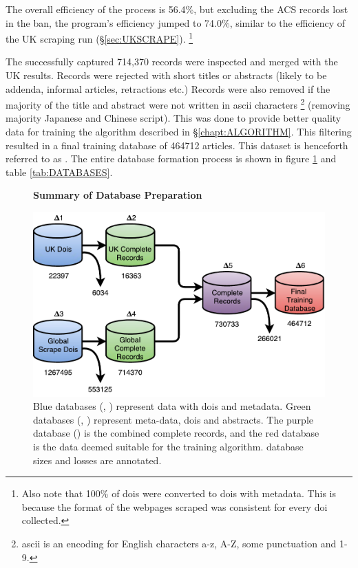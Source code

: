 The overall efficiency of the process is 56.4\%, but excluding the ACS records lost in the ban, the program's efficiency jumped to 74.0\%, similar to the efficiency of the UK scraping run (\S\ref{sec:UKSCRAPE}). \footnote{Also note that 100\% of dois were converted to dois with metadata. This is because the format of the webpages scraped was consistent for every doi collected.}

The successfully captured 714,370 records were inspected and merged with the UK results. Records were rejected with short titles or abstracts (likely to be addenda, informal articles, retractions etc.) Records were also removed if the majority of the title and abstract were not written in ascii characters \footnote{ascii is an encoding for English characters a-z, A-Z, some punctuation and 1-9.} (removing majority Japanese and Chinese script). This was done to provide better quality data for training the algorithm described in  \S\ref{chapt:ALGORITHM}. This filtering resulted in a final training database of 464712 articles. This dataset is henceforth referred to as . The entire database formation process is shown in figure \ref{fig:DATABASES} and table \ref{tab:DATABASES}.
\begin{figure}[H]
    \centering
    \textbf{Summary of Database Preparation}\par\medskip
    \includegraphics[scale=0.6]{Data_Acquisition/Databases2.pdf}
    \caption[Summary of Database Preparation]{Blue databases (, ) represent data with dois and metadata. Green databases (,  ) represent meta-data, dois and abstracts. The purple database () is the combined complete records, and the red database is the data deemed suitable for the training algorithm. database sizes and losses are annotated.}
     \label{fig:DATABASES}
\end{figure}
